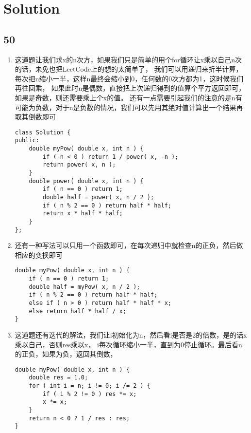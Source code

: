 \documentclass[12pt,a4paper]{article}
\begin{document}
\section{Solution}
\subsection{50}
\begin{enumerate}
\item
\begin{CJK}{UTF8}{gbsn}
这道题让我们求x的n次方，如果我们只是简单的用个for循环让x乘以自己n次的话，未免也把LeetCode上的想的太简单了，
我们可以用递归来折半计算，每次把n缩小一半，这样n最终会缩小到0，任何数的0次方都为1，这时候我们再往回乘，
如果此时n是偶数，直接把上次递归得到的值算个平方返回即可，如果是奇数，则还需要乘上个x的值。
还有一点需要引起我们的注意的是n有可能为负数，对于n是负数的情况，我们可以先用其绝对值计算出一个结果再取其倒数即可
\end{CJK}
\begin{lstlisting}
class Solution {
public:
	double myPow( double x, int n ) {
		if ( n < 0 ) return 1 / power( x, -n );
		return power( x, n );
	}
	double power( double x, int n ) {
		if ( n == 0 ) return 1;
		double half = power( x, n / 2 );
		if ( n % 2 == 0 ) return half * half;
		return x * half * half;
	}
};
\end{lstlisting}
\item
\begin{CJK}{UTF8}{gbsn}
还有一种写法可以只用一个函数即可，在每次递归中就检查n的正负，然后做相应的变换即可
\end{CJK}
\begin{lstlisting}
double myPow( double x, int n ) {
	if ( n == 0 ) return 1;
	double half = myPow( x, n / 2 );
	if ( n % 2 == 0 ) return half * half;
	else if ( n > 0 ) return half * half * x;
	else return half * half / x;
}
\end{lstlisting}
\item
\begin{CJK}{UTF8}{gbsn}
这道题还有迭代的解法，我们让i初始化为n，然后看i是否是2的倍数，是的话x乘以自己，否则res乘以x，
i每次循环缩小一半，直到为0停止循环。最后看n的正负，如果为负，返回其倒数，
\end{CJK}
\begin{lstlisting}
double myPow( double x, int n ) {
	double res = 1.0;
	for ( int i = n; i != 0; i /= 2 ) {
		if ( i % 2 != 0 ) res *= x;
		x *= x;
	}
	return n < 0 ? 1 / res : res;
}
\end{lstlisting}
\end{enumerate}
\end{document}
